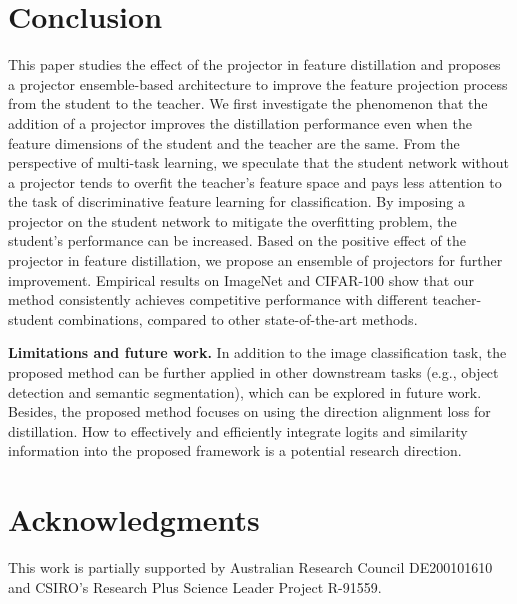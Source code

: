 \documentclass{article}
\begin{document}
\section{Conclusion} \label{limitationsection}
This paper studies the effect of the projector in feature distillation and proposes a projector ensemble-based architecture to improve the feature projection process from the student to the teacher. We first investigate the phenomenon that the addition of a projector improves the distillation performance even when the feature dimensions of the student and the teacher are the same. From the perspective of multi-task learning, we speculate that the student network without a projector tends to overfit the teacher's feature space and pays less attention to the task of discriminative feature learning for classification. By imposing a projector on the student network to mitigate the overfitting problem, the student's performance can be increased. Based on the positive effect of the projector in feature distillation, we propose an ensemble of projectors for further improvement. Empirical results on ImageNet and CIFAR-100 show that our method consistently achieves competitive performance with different teacher-student combinations, compared to other state-of-the-art methods.

\textbf{Limitations and future work. }
In addition to the image classification task, the proposed method can be further applied in other downstream tasks (e.g., object detection and semantic segmentation), which can be explored in future work. Besides, the proposed method focuses on using the direction alignment loss for distillation. How to effectively and efficiently integrate logits and similarity information into the proposed framework is a potential research direction.  

\section{Acknowledgments} 
This work is partially supported by Australian Research Council DE200101610 and CSIRO's Research Plus Science Leader Project R-91559.



\end{document}
